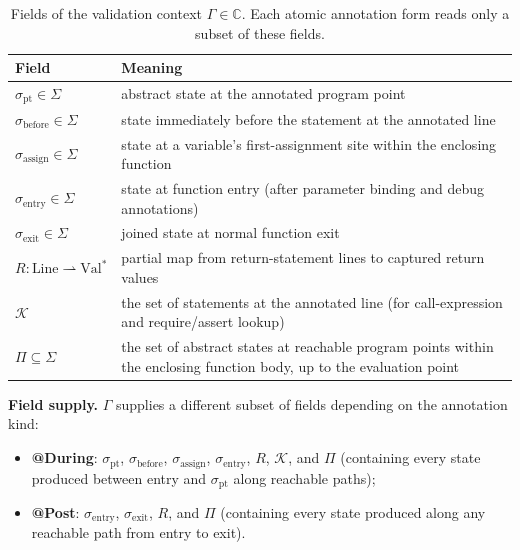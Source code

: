 \documentclass[pdflatex,sn-basic]{sn-jnl}%
\theoremstyle{thmstyleone}%
\theoremstyle{thmstyletwo}%
\theoremstyle{thmstylethree}%
\begin{document}
\begin{table}[t]
\centering
\caption{Fields of the validation context $\Gamma \in \mathbb{C}$. Each atomic annotation form reads only a subset of these fields.}
\label{tab:validation-context}
\small
\begin{tabularx}{\linewidth}{@{} l L @{}}
\toprule
Field & Meaning \\
\midrule
$\sigma_{\text{pt}} \in \Sigma$ & abstract state at the annotated program point \\
$\sigma_{\text{before}} \in \Sigma$ & state immediately before the statement at the annotated line \\
$\sigma_{\text{assign}} \in \Sigma$ & state at a variable's first-assignment site within the enclosing function \\
$\sigma_{\text{entry}} \in \Sigma$ & state at function entry (after parameter binding and debug annotations) \\
$\sigma_{\text{exit}} \in \Sigma$ & joined state at normal function exit \\
$R : \text{Line} \rightharpoonup \text{Val}^*$ & partial map from return-statement lines to captured return values \\
$\mathcal{K}$ & the set of statements at the annotated line (for call-expression and require/assert lookup) \\
$\Pi \subseteq \Sigma$ & the set of abstract states at reachable program points within the enclosing function body, up to the evaluation point \\
\bottomrule
\end{tabularx}
\end{table}

\smallskip
\noindent\textbf{Field supply.}
$\Gamma$ supplies a different subset of fields depending on the annotation kind:
\begin{itemize}
    \item \textbf{@During}: $\sigma_{\text{pt}}$, $\sigma_{\text{before}}$, $\sigma_{\text{assign}}$, $\sigma_{\text{entry}}$, $R$, $\mathcal{K}$, and $\Pi$ (containing every state produced between entry and $\sigma_{\text{pt}}$ along reachable paths);
    \item \textbf{@Post}: $\sigma_{\text{entry}}$, $\sigma_{\text{exit}}$, $R$, and $\Pi$ (containing every state produced along any reachable path from entry to exit).
\end{itemize}
\end{document}
